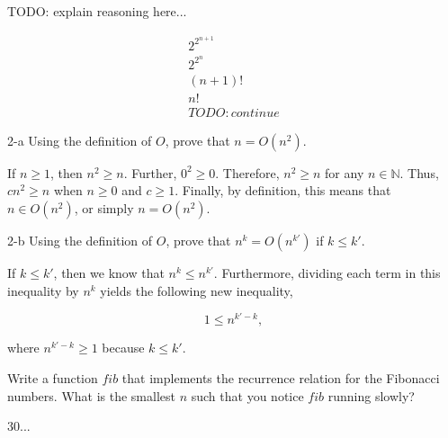 \documentclass[11pt]{article}
\begin{document}
\begin{prob}{1}
\end{prob}
\begin{sol} 
TODO: explain reasoning here...

\begin{eqnarray*}
2^{2^{n+1}} \\
2^{2^{n}} \\ 
(n+1)! \\
n! \\
TODO: continue
\end{eqnarray*}
\end{sol}

\begin{prob}{2-a}
Using the definition of $O$, prove that $n = O(n^{2})$.
\end{prob}
\begin{sol} 
If $n \geq 1$, then $n^{2} \geq n$. Further, $0^{2} \geq 0$. Therefore, $n^{2} \geq n$ for any $n \in \mathbb{N}$. Thus, $cn^{2} \geq n$ when $n \geq 0$ and $c \geq 1$. Finally, by definition, this means that $n \in O(n^{2})$, or simply $n = O(n^{2})$.
\end{sol}

\begin{prob}{2-b}
Using the definition of $O$, prove that $n^{k} = O(n^{k'})$ if $k \leq k'$.
\end{prob}
\begin{sol} 

If $k \leq k'$, then we know that $n^{k} \leq n^{k'}$. Furthermore, dividing each term in this inequality by $n^{k}$ yields the following new inequality,

\begin{equation*}
1 \leq n^{k' - k},
\end{equation*}

where $n^{k' - k} \geq 1$ because $k \leq k'$.

\end{sol}

\begin{prob}{3}
Write a function $fib$ that implements the recurrence relation for the Fibonacci numbers. What is the smallest $n$ such that you notice $fib$ running slowly?
\end{prob}
\begin{sol} 
30...
\end{sol}

\begin{prob}{4}
\end{prob}
\begin{sol} 

\end{sol}

\begin{prob}{5}
\end{prob}
\begin{sol} 

\end{sol}
\end{document}

